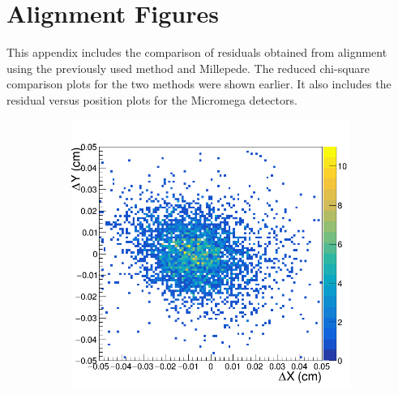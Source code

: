\chapter{Alignment Figures}
\label{sec:app_1}
This appendix includes the comparison of residuals obtained from alignment using the previously used method and Millepede. The reduced chi-square comparison plots for the two methods were shown earlier.
It also includes the residual versus position plots for the Micromega detectors.
\begin{figure}[h!]
\centering
 \begin{subfigure}[l]{.45\textwidth}
   \centering
   \includegraphics[width=\linewidth]{thesis_figures/alignment/Run_3211_after_prev/square/GEM1.png}


\end{subfigure}
\end{figure}
